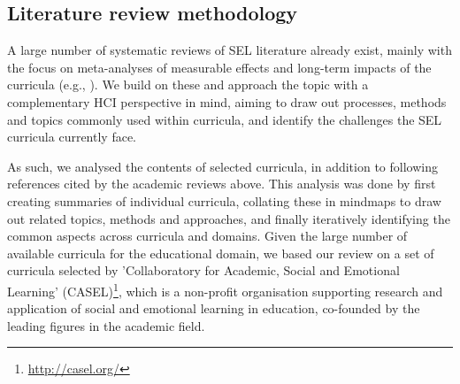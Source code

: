 \documentclass[prodmode,acmtochi]{acmsmall}
\begin{document}



        
\subsection{Literature review methodology}      
\label{sec:methodology}
A large number of systematic reviews of SEL literature already exist, mainly with the focus on meta-analyses of measurable effects and long-term impacts of the curricula (e.g., \cite{Durlak2011,Weare2011,Adi2007a,Greenberg2010,Elbertson2009,Payton2008}). 
%
We build on these and approach the topic with a complementary HCI perspective in mind, aiming to draw out processes, methods and topics commonly used within curricula, and identify the challenges the SEL curricula currently face. 

As such, we analysed the contents of selected curricula, in addition to following references cited by the academic reviews above. This analysis was done by first creating summaries of individual curricula, collating these in mindmaps to draw out related topics, methods and approaches, and finally iteratively identifying the common aspects across curricula and domains. 
%
Given the large number of available curricula for the educational domain, we based our review on a set of curricula selected by 'Collaboratory for Academic, Social and Emotional Learning' (CASEL)\footnote{\url{http://casel.org/}}, which is a non-profit organisation supporting research and application of social and emotional learning in education, co-founded by the leading figures in the academic field. 
\end{document}
